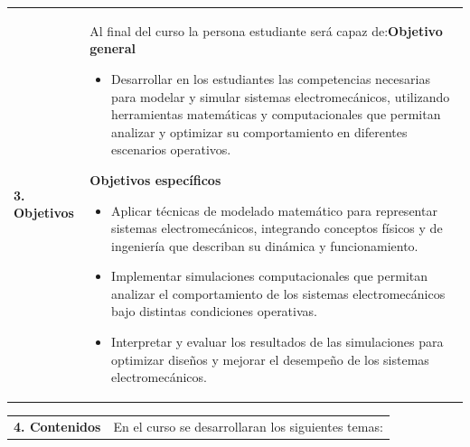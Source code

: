 \documentclass[letterpaper]{article}%
\begin{document}
\vspace*{4mm}%
\newline%
\begin{tabularx}{\textwidth}{p{3cm}p{13cm}}%
\par\fontsize{12}{14}\selectfont \textbf{\textcolor{parte}{3. Objetivos}}&Al final del curso la persona estudiante será capaz de:\newline\newline \textbf{Objetivo general}\begin{itemize}\item Desarrollar en los estudiantes las competencias necesarias para modelar y simular sistemas electromecánicos, utilizando herramientas matemáticas y computacionales que permitan analizar y optimizar su comportamiento en diferentes escenarios operativos.\end{itemize} \vspace{2mm}\textbf{Objetivos específicos}\begin{itemize}\item Aplicar técnicas de modelado matemático para representar sistemas electromecánicos, integrando conceptos físicos y de ingeniería que describan su dinámica y funcionamiento.\item Implementar simulaciones computacionales que permitan analizar el comportamiento de los sistemas electromecánicos bajo distintas condiciones operativas.\item Interpretar y evaluar los resultados de las simulaciones para optimizar diseños y mejorar el desempeño de los sistemas electromecánicos.\end{itemize}\\%
\end{tabularx}%
\newpage%
\begin{tabularx}{\textwidth}{p{3cm}p{13cm}}%
\par\fontsize{12}{14}\selectfont \textbf{\textcolor{parte}{4. Contenidos}}&En el curso se desarrollaran los siguientes temas:\\%
\end{tabularx}%
\end{document}
